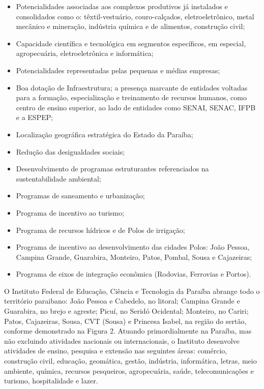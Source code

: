 \begin{itemize}
	\item 	Potencialidades associadas aos complexos produtivos já instalados e consolidados como o: têxtil-vestuário, couro-calçados, eletroeletrônico, metal mecânico 	 	e mineração, indústria química e de alimentos, construção civil; 
	\item 	Capacidade científica e tecnológica em segmentos específicos, em especial, agropecuária, eletroeletrônica e informática; 
	\item 	Potencialidades representadas pelas pequenas e médias empresas; 
	\item 	Boa dotação de Infraestrutura; a presença marcante de entidades voltadas para a formação, especialização e treinamento de recursos humanos, como centro de 		ensino superior, ao lado de entidades como SENAI, SENAC, IFPB e a ESPEP; 
	\item 	Localização geográfica estratégica do Estado da Paraíba; 
	\item 	Redução das desigualdades sociais; 
	\item 	Desenvolvimento de programas estruturantes referenciados na sustentabilidade ambiental; 
	\item 	Programas de saneamento e urbanização;
	\item 	Programa de incentivo ao turismo;
	\item 	Programa de recursos hídricos e de Polos de irrigação;
	\item 	Programa de incentivo ao desenvolvimento das cidades Polos: João Pessoa, Campina Grande, Guarabira, Monteiro, Patos, Pombal, Sousa e Cajazeiras; 
	\item 	Programa de eixos de integração econômica (Rodovias, Ferrovias e Portos).
\end{itemize}
	
	O Instituto Federal de Educação, Ciência e Tecnologia da Paraíba abrange todo o território paraibano: João Pessoa e Cabedelo, no litoral; Campina Grande e Guarabira, no brejo e agreste; Picuí, no Seridó Ocidental; Monteiro, no Cariri; Patos, Cajazeiras, Sousa, CVT (Sousa) e Princesa Isabel, na região do sertão, conforme demonstrado na Figura 2. Atuando primordialmente na Paraíba, mas não excluindo atividades nacionais ou internacionais, o Instituto desenvolve atividades de ensino, pesquisa e extensão nas seguintes áreas: comércio, construção civil, educação, geomática, gestão, indústria, informática, letras, meio ambiente, química, recursos pesqueiros, agropecuária, saúde, telecomunicações e turismo, hospitalidade e lazer.
	
